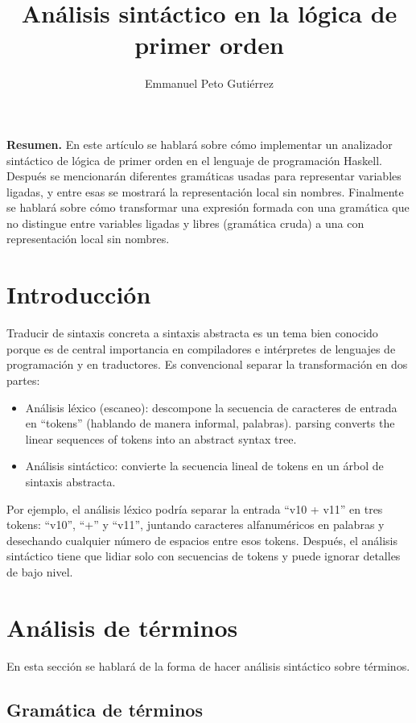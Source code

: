 \documentclass{article}
\title{Análisis sintáctico en la lógica de primer orden}
\author{Emmanuel Peto Gutiérrez}
\begin{document}
\maketitle

\textbf{Resumen.} En este artículo se hablará sobre cómo implementar un analizador sintáctico de lógica de primer orden en el lenguaje de programación Haskell. Después se mencionarán diferentes gramáticas usadas para representar variables ligadas, y entre esas se mostrará la representación local sin nombres. Finalmente se hablará sobre cómo transformar una expresión formada con una gramática que no distingue entre variables ligadas y libres (gramática cruda) a una con representación local sin nombres.

\section{Introducción}

Traducir de sintaxis concreta a sintaxis abstracta es un tema bien conocido porque es de central importancia en  compiladores e intérpretes de lenguajes de programación y en traductores. Es convencional separar la transformación en dos partes\cite{harrison}:

\begin{itemize}
\item Análisis léxico (escaneo): descompone la secuencia de caracteres de entrada en ``tokens'' (hablando de manera informal, palabras).
parsing converts the linear sequences of tokens into an abstract syntax
tree.
\item Análisis sintáctico: convierte la secuencia lineal de tokens en un árbol de sintaxis abstracta.
\end{itemize}

Por ejemplo, el análisis léxico podría separar la entrada ``v10 + v11'' en tres tokens: ``v10'', ``+'' y ``v11'', juntando caracteres alfanuméricos en palabras y desechando cualquier número de espacios entre esos tokens. Después, el análisis sintáctico tiene que lidiar solo con secuencias de tokens y puede ignorar detalles de bajo nivel.

\section{Análisis de términos}

En esta sección se hablará de la forma de hacer análisis sintáctico sobre términos.

\subsection{Gramática de términos}
\end{document}
